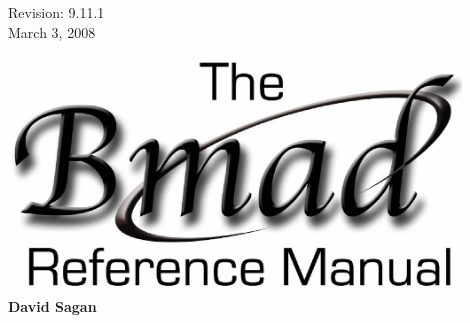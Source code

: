 \thispagestyle{empty}

\begin{flushright}
\large
  Revision: 9.11.1 \\
  March 3, 2008 \\
\end{flushright}

\vfill

{
\begin{center}
\includegraphics[width=12cm]{bmad-ref-manual.eps} \\
\vskip 0.3in
\huge\bf David Sagan
\end{center}
}

\vfill
\break

